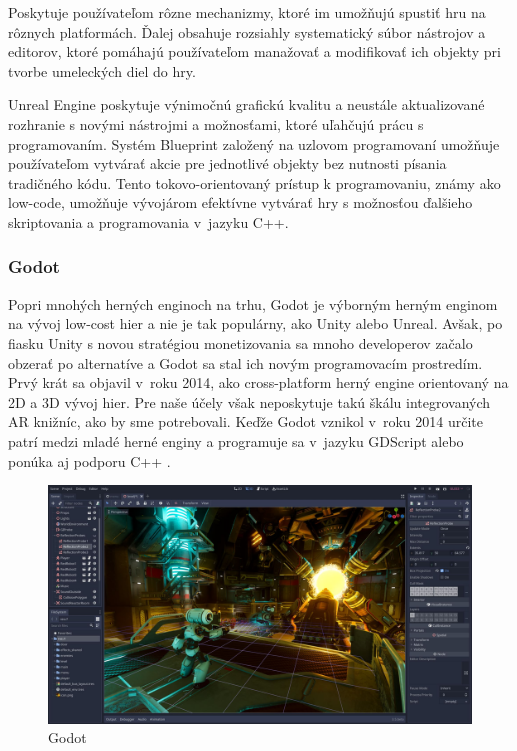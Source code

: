 Poskytuje používateľom rôzne mechanizmy, ktoré im umožňujú spustiť hru na rôznych platformách. Ďalej obsahuje rozsiahly systematický súbor nástrojov a editorov, ktoré pomáhajú používateľom manažovať a modifikovať ich objekty pri tvorbe umeleckých diel do hry. %

Unreal Engine poskytuje výnimočnú grafickú kvalitu a neustále aktualizované rozhranie s novými nástrojmi a možnosťami, ktoré uľahčujú prácu s programovaním. Systém Blueprint založený na uzlovom programovaní umožňuje používateľom vytvárať akcie pre jednotlivé objekty bez nutnosti písania tradičného kódu. Tento tokovo-orientovaný prístup k programovaniu, známy ako low-code, umožňuje vývojárom efektívne vytvárať hry s možnosťou ďalšieho skriptovania a programovania v~jazyku C++. %

\subsubsection{Godot}

Popri mnohých herných enginoch na trhu, Godot je výborným herným enginom na vývoj low-cost hier a nie je tak populárny, ako Unity alebo Unreal. Avšak, po fiasku Unity s novou stratégiou monetizovania sa mnoho developerov začalo obzerať po alternatíve a Godot sa stal ich novým programovacím prostredím. Prvý krát sa objavil v~roku 2014, ako cross-platform herný engine orientovaný na 2D a 3D vývoj hier. Pre naše účely však neposkytuje takú škálu integrovaných AR knižníc, ako by sme potrebovali. Keďže Godot vznikol v~roku 2014 určite patrí medzi mladé herné enginy a programuje sa v~jazyku GDScript alebo ponúka aj podporu C++ \cite{zenva2023godot}. 

\begin{figure}[h]
\centering
\includegraphics[width=1\textwidth]{img/godot_editor.jpg}
\caption{Godot \cite{godottps}}
\label{fig:godotEditor}
\end{figure}


